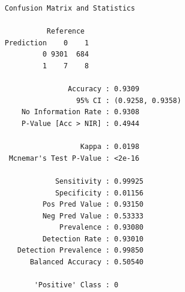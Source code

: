 \documentclass[11pt, fleqn]{article}
\begin{document}
\begin{verbatim}
Confusion Matrix and Statistics

          Reference
Prediction    0    1
         0 9301  684
         1    7    8
                                          
               Accuracy : 0.9309          
                 95% CI : (0.9258, 0.9358)
    No Information Rate : 0.9308          
    P-Value [Acc > NIR] : 0.4944          
                                          
                  Kappa : 0.0198          
 Mcnemar's Test P-Value : <2e-16          
                                          
            Sensitivity : 0.99925         
            Specificity : 0.01156         
         Pos Pred Value : 0.93150         
         Neg Pred Value : 0.53333         
             Prevalence : 0.93080         
         Detection Rate : 0.93010         
   Detection Prevalence : 0.99850         
      Balanced Accuracy : 0.50540         
                                          
       'Positive' Class : 0     
\end{verbatim}
\end{document}
